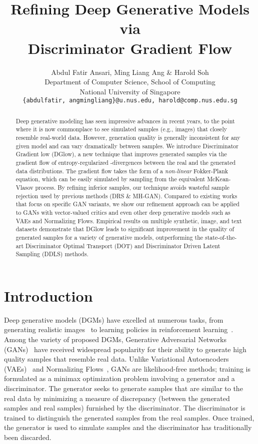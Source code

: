 \documentclass{article} \usepackage{iclr2021_conference,times}
\title{Refining Deep Generative Models via\\Discriminator Gradient Flow}
\author{Abdul Fatir Ansari, Ming Liang Ang \& Harold Soh\\
Department of Computer Science, School of Computing\\
National University of Singapore\\
\texttt{\{abdulfatir, angmingliang\}@u.nus.edu, harold@comp.nus.edu.sg}
}
\begin{document}
\maketitle

\begin{abstract}
Deep generative modeling has seen impressive advances in recent years, to the point where it is now commonplace to see simulated samples (e.g., images) that closely resemble real-world data. However, generation quality is generally inconsistent for any given model and can vary dramatically between samples. We introduce Discriminator Gradient low (DGlow), a new technique that improves generated samples via the gradient flow of entropy-regularized -divergences between the real and the generated data distributions. The gradient flow takes the form of a \emph{non-linear} Fokker-Plank equation, which can be easily simulated by sampling from the equivalent McKean-Vlasov process. By refining inferior samples, our technique avoids wasteful sample rejection used by previous methods (DRS \& MH-GAN). Compared to existing works that focus on specific GAN variants, we show our refinement approach can be applied to GANs with vector-valued critics and even other deep generative models such as VAEs and Normalizing Flows. Empirical results on multiple synthetic, image, and text datasets demonstrate that DGlow leads to significant improvement in the quality of generated samples for a variety of generative models, outperforming the state-of-the-art Discriminator Optimal Transport (DOT) and Discriminator Driven Latent Sampling (DDLS) methods.
\end{abstract}


\section{Introduction}
Deep generative models (DGMs) have excelled at numerous tasks, from generating realistic images~\citep{brock2018large} to 
learning policies in reinforcement learning~\citep{Ho2016GenerativeAI}. Among the variety of proposed DGMs, Generative Adversarial Networks (GANs)~\citep{goodfellow2014generative} have received widespread popularity for their ability to generate high quality samples that resemble real data. 
Unlike Variational Autoencoders (VAEs)~\citep{Kingma2014AutoEncodingVB} and Normalizing Flows~\citep{Rezende2015VariationalIW,kingma2018glow}, GANs are likelihood-free methods; training is formulated as a minimax optimization problem involving a generator and a discriminator. The generator seeks to generate samples that are similar to the real data by minimizing a measure of discrepancy (between the generated samples and real samples) furnished by the discriminator. The discriminator is trained to distinguish the generated samples from the real samples. Once trained, the generator is used to simulate samples and the discriminator has traditionally been discarded. 
\end{document}
